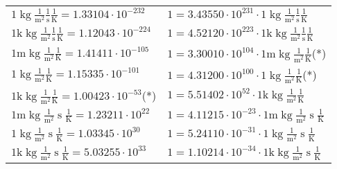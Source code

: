\begin{center}
\begin{longtable}{l l}
{\color{black}$1 \bm{\mathrm{ }}\operatorname{kg}\frac1{\operatorname{m}^2}\frac1{\operatorname{s}}{}\frac1{\operatorname{K}} = 1.33104\cdot10^{-232} $}   & {\color{black}$ 1 = 3.43550\cdot10^{231} \cdot 1 \bm{\mathrm{ }}\operatorname{kg}\frac1{\operatorname{m}^2}\frac1{\operatorname{s}}{}\frac1{\operatorname{K}}$}  \\
{\color{gray}$1 \bm{\mathrm{ k}}\operatorname{kg}\frac1{\operatorname{m}^2}\frac1{\operatorname{s}}{}\frac1{\operatorname{K}} = 1.12043\cdot10^{-224} $}   & {\color{gray}$ 1 = 4.52120\cdot10^{223} \cdot 1 \bm{\mathrm{ k}}\operatorname{kg}\frac1{\operatorname{m}^2}\frac1{\operatorname{s}}{}\frac1{\operatorname{K}}$}  \\
{\color{gray}$1 \bm{\mathrm{ m}}\operatorname{kg}\frac1{\operatorname{m}^2}{}{}\frac1{\operatorname{K}} = 1.41411\cdot10^{-105} $}   & {\color{gray}$ 1 = 3.30010\cdot10^{104} \cdot 1 \bm{\mathrm{ m}}\operatorname{kg}\frac1{\operatorname{m}^2}{}{}\frac1{\operatorname{K}}$}\quad(*)\\
{\color{black}$1 \bm{\mathrm{ }}\operatorname{kg}\frac1{\operatorname{m}^2}{}{}\frac1{\operatorname{K}} = 1.15335\cdot10^{-101} $}   & {\color{black}$ 1 = 4.31200\cdot10^{100} \cdot 1 \bm{\mathrm{ }}\operatorname{kg}\frac1{\operatorname{m}^2}{}{}\frac1{\operatorname{K}}$}\quad(*)\\
{\color{gray}$1 \bm{\mathrm{ k}}\operatorname{kg}\frac1{\operatorname{m}^2}{}{}\frac1{\operatorname{K}} = 1.00423\cdot10^{-53} $}\quad(*) & {\color{gray}$ 1 = 5.51402\cdot10^{52} \cdot 1 \bm{\mathrm{ k}}\operatorname{kg}\frac1{\operatorname{m}^2}{}{}\frac1{\operatorname{K}}$}  \\
{\color{gray}$1 \bm{\mathrm{ m}}\operatorname{kg}\frac1{\operatorname{m}^2}{\operatorname{s}}{}\frac1{\operatorname{K}} = 1.23211\cdot10^{22} $}   & {\color{gray}$ 1 = 4.11215\cdot10^{-23} \cdot 1 \bm{\mathrm{ m}}\operatorname{kg}\frac1{\operatorname{m}^2}{\operatorname{s}}{}\frac1{\operatorname{K}}$}  \\
{\color{black}$1 \bm{\mathrm{ }}\operatorname{kg}\frac1{\operatorname{m}^2}{\operatorname{s}}{}\frac1{\operatorname{K}} = 1.03345\cdot10^{30} $}   & {\color{black}$ 1 = 5.24110\cdot10^{-31} \cdot 1 \bm{\mathrm{ }}\operatorname{kg}\frac1{\operatorname{m}^2}{\operatorname{s}}{}\frac1{\operatorname{K}}$}  \\
{\color{gray}$1 \bm{\mathrm{ k}}\operatorname{kg}\frac1{\operatorname{m}^2}{\operatorname{s}}{}\frac1{\operatorname{K}} = 5.03255\cdot10^{33} $}   & {\color{gray}$ 1 = 1.10214\cdot10^{-34} \cdot 1 \bm{\mathrm{ k}}\operatorname{kg}\frac1{\operatorname{m}^2}{\operatorname{s}}{}\frac1{\operatorname{K}}$}  \\

\end{longtable}
\end{center}
